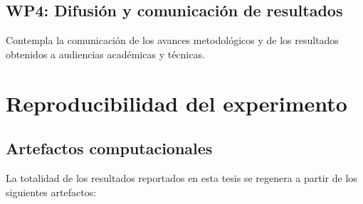 \section{WP4: Difusión y comunicación de resultados}

Contempla la comunicación de los avances metodológicos y de los resultados obtenidos a audiencias académicas y técnicas.

\chapter{Reproducibilidad del experimento}
\label{anx:reproducibilidad}

\section{Artefactos computacionales}

La totalidad de los resultados reportados en esta tesis se regenera a partir de los siguientes artefactos:

